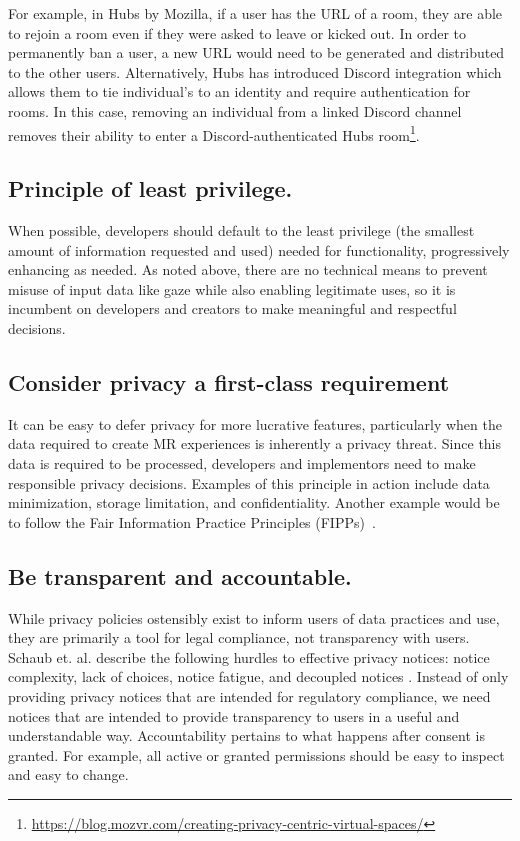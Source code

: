 For example, in Hubs by Mozilla, if a user has the URL of a room, they are able to rejoin a room even if they were asked to leave or kicked out. In order to permanently ban a user, a new URL would need to be generated and distributed to the other users. Alternatively, Hubs has introduced Discord integration which allows them to tie individual's to an identity and require authentication for rooms. In this case, removing an individual from a linked Discord channel removes their ability to enter a Discord-authenticated Hubs room\footnote{\url{https://blog.mozvr.com/creating-privacy-centric-virtual-spaces/}}.

\subsection{Principle of least privilege.}
When possible, developers should default to the least privilege (the smallest amount of information requested and used) needed for functionality, progressively enhancing as needed. As noted above, there are no technical means to prevent misuse of input data like gaze while also enabling legitimate uses, so it is incumbent on developers and creators to make meaningful and respectful decisions.

\subsection{Consider privacy a first-class requirement}
It can be easy to defer privacy for more lucrative features, particularly when the data required to create MR experiences is inherently a privacy threat. Since this data is required to be processed,  developers and implementors need to make responsible privacy decisions. Examples of this principle in action include data minimization, storage limitation, and confidentiality. Another example would be to follow the Fair Information Practice Principles (FIPPs)~\cite{fipps}.

\subsection{Be transparent and accountable.}
While privacy policies ostensibly exist to inform users of data practices and use, they are primarily a tool for legal compliance, not transparency with users. Schaub et. al. describe the following hurdles to effective privacy notices: notice complexity, lack of choices, notice fatigue, and decoupled notices \cite{schaub}. Instead of only providing privacy notices that are intended for regulatory compliance, we need notices that are intended to provide transparency to users in a useful and understandable way. Accountability pertains to what happens after consent is granted. For example, all active or granted permissions should be easy to inspect and easy to change.
